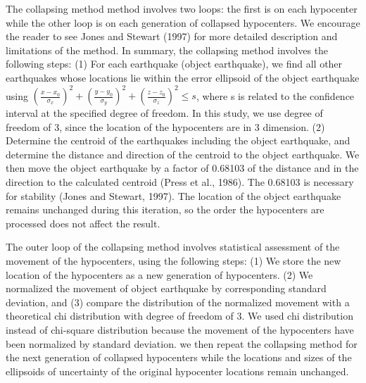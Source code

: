 \documentclass[draft]{agujournal2018}
\begin{document}
The collapsing method method involves two loops: the first is on each hypocenter while the other loop is on each generation of collapsed hypocenters. We encourage the reader to see Jones and Stewart (1997) for more detailed description and limitations of the method. %
In summary, the collapsing method involves the following steps: (1) For each earthquake (object earthquake), we find all other earthquakes whose locations lie within the error ellipsoid of the object earthquake using $(\frac{x-x_0}{\sigma_x})^2 + (\frac{y-y_0}{\sigma_y})^2 + (\frac{z-z_0}{\sigma_z})^2 \le s $, where s is related to the confidence interval at the specified degree of freedom. In this study, we use degree of freedom of 3, since the location of the hypocenters are in 3 dimension. (2) Determine the centroid of the earthquakes including the object earthquake, and determine the distance and direction of the centroid to the object earthquake. We then move the object earthquake by a factor of 0.68103 of the distance and in the direction to the calculated centroid (Press et al., 1986). The 0.68103 is necessary for stability (Jones and Stewart, 1997). The location of the object earthquake remains unchanged during this iteration, so the order the hypocenters are processed does not affect the result. 

The outer loop of the collapsing method involves statistical assessment of the movement of the hypocenters, using the following steps: (1) We store the new location of the hypocenters as a new generation of hypocenters. (2) We normalized the movement of object earthquake by corresponding standard deviation, and (3) compare the distribution of the normalized movement with a theoretical chi distribution with degree of freedom of 3. We used chi distribution instead of chi-square distribution because the movement of the hypocenters have been normalized by standard deviation. we then repeat the collapsing method for the next generation of collapsed hypocenters while the locations and sizes of the ellipsoids of uncertainty of the original hypocenter locations remain unchanged. %
\end{document}
